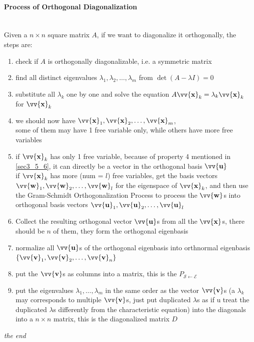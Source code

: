 \documentclass[11pt]{article}
\DeclareRobustCommand{\myvec}[1]{\vv{\mathbf{#1}}}
\newcommand{\myset}[1]{\mathcal{#1}}
\newcommand{\mymat}[1]{#1}
\begin{document}
    \begin{minipage}{\textwidth}
        \raggedright
        \paragraph{Process of Orthogonal Diagonalization}~\vspace{1ex}\\
        Given a $n \times n$ square matrix $\mymat{A}$, if we want to diagonalize it orthogonally, the steps are:
        \begin{enumerate}
            \item check if $\mymat{A}$ is orthogonally diagonalizable, i.e. a symmetric matrix
            \item find all distinct eigenvalues $\lambda_1, \lambda_2, \dots, \lambda_m$ from $\det(\mymat{A} - \lambda\mymat{I}) = 0$
            \item substitute all $\lambda_k$ one by one and solve the equation $\mymat{A}\myvec{x}_k=\lambda_k\myvec{x}_k$ for $\myvec{x}_k$
            \item[-.] we should now have $\myvec{x}_1, \myvec{x}_2, \dots, \myvec{x}_m$, \\
                some of them may have 1 free variable only, while others have more free variables    
            \item if $\myvec{x}_k$ has only 1 free variable, because of property 4 mentioned in \ref{sec3_5_6}, it can directly be a vector in the orthogonal basis $\myvec{u}$\vspace{1ex} \\
                if $\myvec{x}_k$ has more (num = $l$) free variables, get the basis vectors $\myvec{w}_1, \myvec{w}_2, \dots, \myvec{w}_l$ for the eigenspace of $\myvec{x}_k$, 
                and then use the Gram-Schmidt Orthogonalization Process to process the $\myvec{w}$s into orthogonal basis vectors $\myvec{u}_1, \myvec{u}_2, \dots, \myvec{u}_l$
            \item[-.] Collect the resulting orthogonal vector $\myvec{u}$s from all the $\myvec{x}$s, there should be $n$ of them, they form the orthogonal eigenbasis
            \item normalize all $\myvec{u}$s of the orthogonal eigenbasis into orthnormal eigenbasis $\{ \myvec{v}_1, \myvec{v}_2, \dots, \myvec{v}_n \}$
            \item put the $\myvec{v}$s as columns into a matrix, this is the $\mymat{P}_{\myset{S}\leftarrow\myset{E}}$
            \item put the eigenvalues $\lambda_1, \dots, \lambda_m$ in the same order as the vector $\myvec{v}$s (a $\lambda_k$ may corresponds to multiple $\myvec{v}$s, just put duplicated $\lambda$s as if u treat the duplicated $\lambda$s differently from the characteristic equation) into the diagonals into a $n \times n$ matrix, this is the diagonalized matrix $\mymat{D}$
        \end{enumerate}
    \end{minipage}
    
    \newpage
    \vspace*{\fill}
    \begin{center}
        \LARGE
        \selectfont\itshape the end
    \end{center}
    \vspace*{\fill}
    
\end{document}
